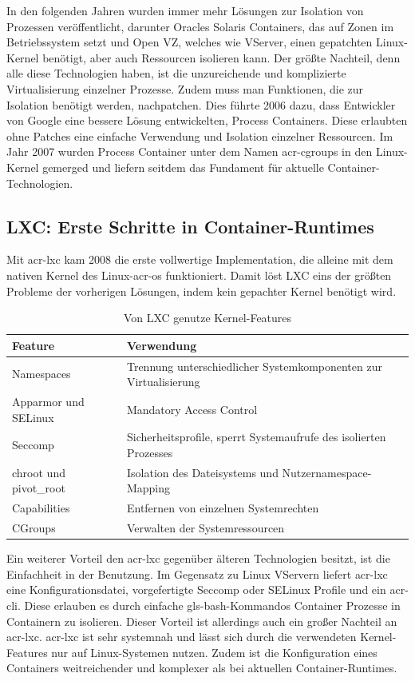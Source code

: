 In den folgenden Jahren wurden immer mehr Lösungen zur Isolation von Prozessen veröffentlicht, darunter Oracles Solaris Containers, das auf Zonen im Betriebssystem setzt und Open VZ, welches wie VServer, einen gepatchten Linux-Kernel benötigt, aber auch Ressourcen isolieren kann. Der größte Nachteil, denn alle diese Technologien haben, ist die unzureichende und komplizierte Virtualisierung einzelner Prozesse. Zudem muss man Funktionen, die zur Isolation benötigt werden, nachpatchen. Dies führte 2006 dazu, dass Entwickler von Google eine bessere Lösung entwickelten, Process Containers. Diese erlaubten ohne Patches eine einfache Verwendung und Isolation einzelner Ressourcen. Im Jahr 2007 wurden Process Container unter dem Namen \glspl{acr-cgroup} in den Linux-Kernel gemerged und liefern seitdem das Fundament für aktuelle Container-Technologien.

\subsection{LXC: Erste Schritte in Container-Runtimes}
\label{sec:geschichteLXC}
Mit \gls{acr-lxc} kam 2008 die erste vollwertige Implementation, die alleine mit dem nativen Kernel des Linux-\gls{acr-os} funktioniert. Damit löst LXC eins der größten Probleme der vorherigen Lösungen, indem kein gepachter Kernel benötigt wird.
\begin{table}[h]
		\begin{tabu} to 
			\toprule
			Feature & Verwendung\\
			\midrule
			Namespaces & Trennung unterschiedlicher Systemkomponenten zur Virtualisierung\\
			Apparmor und SELinux & Mandatory Access Control\\
			Seccomp & Sicherheitsprofile, sperrt Systemaufrufe des isolierten Prozesses\\
			chroot und pivot\_root & Isolation des Dateisystems und Nutzernamespace-Mapping\\
			Capabilities & Entfernen von einzelnen Systemrechten\\
			CGroups & Verwalten der Systemressourcen\\
			\bottomrule
		\end{tabu}
	\caption{Von LXC genutze Kernel-Features \citep{Lxc7LinuxManualPage}}
	\label{tab:lxcKernel}
\end{table}

Ein weiterer Vorteil den \gls{acr-lxc} gegenüber älteren Technologien besitzt, ist die Einfachheit in der Benutzung. Im Gegensatz zu Linux VServern liefert \gls{acr-lxc} eine Konfigurationsdatei, vorgefertigte Seccomp oder SELinux Profile und ein \gls{acr-cli}. Diese erlauben es durch einfache \Gls{gls-bash}-Kommandos Container Prozesse in Containern zu isolieren. Dieser Vorteil ist allerdings auch ein großer Nachteil an \gls{acr-lxc}. \gls{acr-lxc} ist sehr systemnah und lässt sich durch die verwendeten Kernel-Features nur auf Linux-Systemen nutzen. Zudem ist die Konfiguration eines Containers weitreichender und komplexer als bei aktuellen Container-Runtimes.

